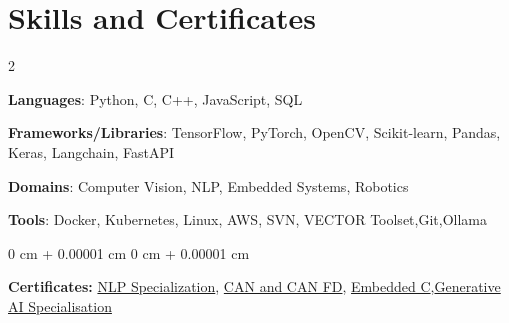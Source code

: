 \documentclass[10pt, letterpaper]{article}
\newenvironment{onecolentry}{
    \begin{adjustwidth}{
        0 cm + 0.00001 cm
    }{
        0 cm + 0.00001 cm
    }
}{
    \end{adjustwidth}
} %
\begin{document}
\section{Skills and Certificates}
        \vspace{-0.65em}
        \setlength{\parskip}{0em} %
        \begin{multicols}{2}
        \raggedright
        \textbf{Languages}: Python, C, C++, JavaScript, SQL
        
        \textbf{Frameworks/Libraries}: TensorFlow, PyTorch, OpenCV, Scikit-learn, Pandas, Keras, Langchain, FastAPI
        

        \columnbreak
        
        \textbf{Domains}: Computer Vision, NLP, Embedded Systems, Robotics
        
        \textbf{Tools}: Docker, Kubernetes, Linux, AWS, SVN, VECTOR Toolset,Git,Ollama
        
        \end{multicols}
        \vspace{-0.4em}
        \begin{onecolentry}
            \textbf{Certificates:} {\href{https://coursera.org/share/4fff411dc664c33bda2f8c042df38c0a}{NLP Specialization}}, {\href{https://www.udemy.com/certificate/UC-44a5173f-dd25-42d9-bf5e-aa49ad9b2beb/}{CAN and CAN FD}}, {\href{https://www.udemy.com/certificate/UC-85bc7d26-54e9-4643-9e56-22eeea8ba561/}{Embedded C}},{\href{https://coursera.org/share/5a13d8715476222078fb5dda04df936f}{Generative AI Specialisation}}
        \end{onecolentry}
        \vspace{-0.4em}


        
\end{document}
